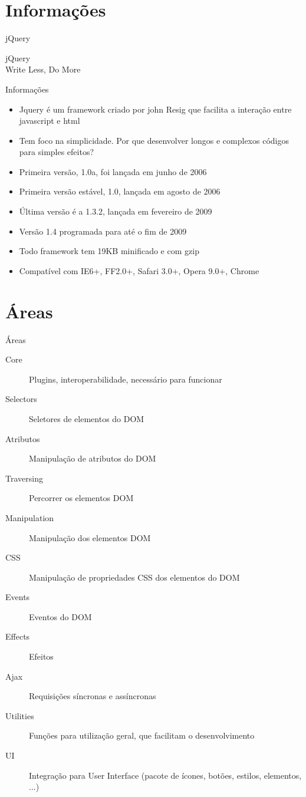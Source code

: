 \section{Informações}
\begin{frame}{jQuery}
	\begin{center}
		{\Huge jQuery} \\
		{\tiny Write Less, Do More}
	\end{center}
\end{frame}

\begin{frame}{Informações}
\begin{itemize}
	\item Jquery é um framework criado por john Resig que facilita a interação entre javascript e html
	\item Tem foco na simplicidade. Por que desenvolver longos e complexos códigos para simples efeitos?
	\item Primeira versão, 1.0a, foi lançada em junho de 2006
	\item Primeira versão estável, 1.0, lançada em agosto de 2006
	\item Última versão é a 1.3.2, lançada em fevereiro de 2009
	\item Versão 1.4 programada para até o fim de 2009
	\item Todo framework tem 19KB minificado e com gzip
	\item Compatível com IE6+, FF2.0+, Safari 3.0+, Opera 9.0+, Chrome
\end{itemize}
\end{frame}

\section{Áreas}
\begin{frame}{Áreas}
\begin{description}
	\item[Core] Plugins, interoperabilidade, necessário para funcionar
	\item[Selectors] Seletores de elementos do DOM
	\item[Atributos] Manipulação de atributos do DOM
	\item[Traversing] Percorrer os elementos DOM
	\item[Manipulation] Manipulação dos elementos DOM
	\item[CSS] Manipulação de propriedades CSS dos elementos do DOM
	\item[Events] Eventos do DOM
	\item[Effects] Efeitos
	\item[Ajax] Requisições síncronas e assíncronas
	\item[Utilities] Funções para utilização geral, que facilitam o desenvolvimento
	\item[UI] Integração para User Interface (pacote de ícones, botões, estilos, elementos, ...)
\end{description}
\end{frame}
